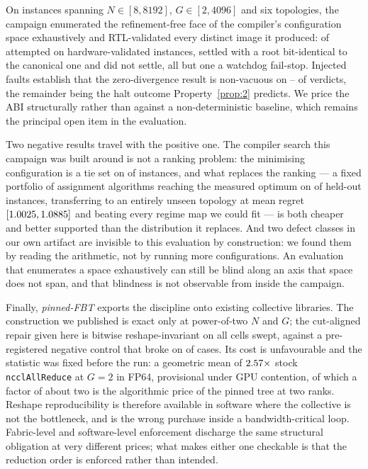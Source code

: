 \documentclass[journal,10pt]{IEEEtran}
\theoremstyle{plain}
\theoremstyle{definition}
\theoremstyle{remark}
\begin{document}
On \SuiteSize{} instances spanning $N \in [8,8192]$, $G \in [2,4096]$ and six
topologies, the campaign enumerated the refinement-free face of the compiler's
configuration space exhaustively and RTL-validated every distinct image it
produced: of \InvAttempted{} attempted on \TournNInst{} hardware-validated
instances, \WallTBs{} settled with a root bit-identical to the canonical one
and \InvNonSettling{} did not settle, all but one a watchdog fail-stop.
Injected faults establish that the zero-divergence result is non-vacuous on
\MutOracleLo{}--\MutOracleHi{} of \MutTotal{} verdicts, the remainder being
the halt outcome Property~\ref{prop:2} predicts. We price the ABI structurally
rather than against a non-deterministic baseline, which remains the principal
open item in the evaluation.

Two negative results travel with the positive one. The compiler search this
campaign was built around is not a ranking problem: the minimising
configuration is a tie set on \ClsTied{} of \TournNInst{} instances, and what
replaces the ranking --- a fixed portfolio of \SelConfigsRun{} assignment
algorithms reaching the measured optimum on \SelKFourOpt{} of \TournNInst{}
held-out instances, transferring to an entirely unseen topology at mean regret
\SelUnseenTopoMean{} $[1.0025, 1.0885]$ and beating every
regime map we could fit --- is both cheaper and better supported than the
distribution it replaces. And two defect classes in our own artifact are
invisible to this evaluation by construction: we found them by reading the
arithmetic, not by running more configurations. An evaluation that enumerates
a space exhaustively can still be blind along an axis that space does not
span, and that blindness is not observable from inside the campaign.

Finally, \emph{pinned-FBT} exports the discipline onto existing collective
libraries. The construction we published is exact only at power-of-two $N$ and
$G$; the cut-aligned repair given here is bitwise reshape-invariant on all
\PinCells{} cells swept, against a pre-registered negative control that broke
on \PinNegFired{} of \PinNegCases{} cases. Its cost is unfavourable and the
statistic was fixed before the run: a geometric mean of $2.57\times$
stock \texttt{ncclAllReduce} at $G{=}2$ in FP64, provisional under GPU
contention, of which a factor of about two is the algorithmic price of the
pinned tree at two ranks. Reshape reproducibility is therefore available in
software where the collective is not the bottleneck, and is the wrong purchase
inside a bandwidth-critical loop. Fabric-level and software-level enforcement
discharge the same structural obligation at very different prices; what makes
either one checkable is that the reduction order is enforced rather than
intended.
\end{document}
